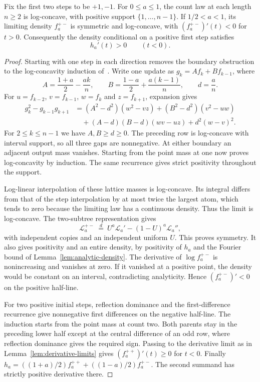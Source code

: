 \begin{lemma}\label{lem:balanced-start}
Fix the first two steps to be $+1,-1$. For $0\le a\le1$, the count
law at each length $n\ge2$ is log-concave, with positive support
$\{1,\ldots,n-1\}$. If $1/2<a<1$, its limiting density
$f_a^{+-}$ is symmetric and log-concave, with
$(f_a^{+-})'(t)<0$ for $t>0$.
Consequently the density conditional on a positive first step satisfies
\[
 h_a'(t)>0\qquad(t<0).
\]
\end{lemma}

\begin{proof}
Starting with one step in each direction removes the boundary obstruction
to the log-concavity induction of~\cite[Proposition~2.2]{glrs2025}.
Write one update as
$g_k=Af_k+Bf_{k-1}$, where
\[
 A=\frac{1+a}{2}-\frac{ak}{n},\qquad
 B=\frac{1-a}{2}+\frac{a(k-1)}n,\qquad d=\frac an.
\]
For $u=f_{k-2}$, $v=f_{k-1}$, $w=f_k$ and $z=f_{k+1}$, expansion gives
\begin{align*}
 g_k^2-g_{k-1}g_{k+1}
 &=(A^2-d^2)(w^2-vz)+(B^2-d^2)(v^2-uw)\\
 &\quad +(A-d)(B-d)(wv-uz)+d^2(w-v)^2.
\end{align*}
For $2\le k\le n-1$ we have $A,B\ge d\ge0$.
The preceding row is log-concave with interval support, so all
three gaps are nonnegative. At either boundary an adjacent output
mass vanishes. Starting from the point mass at one now proves
log-concavity by induction.
The same recurrence gives strict positivity throughout the support.

Log-linear interpolation of these lattice masses is log-concave.
Its integral differs from that of the step interpolation by at most
twice the largest atom, which tends to zero because the limiting law
has a continuous density. Thus the limit is log-concave.
The two-subtree representation gives
\[
 \mathcal L_a^{+-}\ \stackrel d=\ U^a\mathcal L_a'-(1-U)^a\mathcal L_a'',
\]
with independent copies and an independent uniform $U$.
This proves symmetry. It also gives positivity and an entire density,
by positivity of $h_a$ and the Fourier bound of
Lemma~\ref{lem:analytic-density}. The derivative of $\log f_a^{+-}$
is nonincreasing and vanishes at zero. If it vanished at a positive
point, the density would be constant on an interval, contradicting
analyticity. Hence $(f_a^{+-})'<0$ on the positive half-line.

For two positive initial steps, reflection dominance and the
first-difference recurrence give nonnegative first differences on
the negative half-line. The induction starts from the point mass
at count two. Both parents stay in the preceding lower half except
at the central difference of an odd row, where reflection dominance
gives the required sign. Passing to the derivative limit as in
Lemma~\ref{lem:derivative-limits} gives $(f_a^{++})'(t)\ge0$ for $t<0$.
Finally
$h_a=((1+a)/2)f_a^{++}+((1-a)/2)f_a^{+-}$.
The second summand has strictly positive derivative there.
\end{proof}

